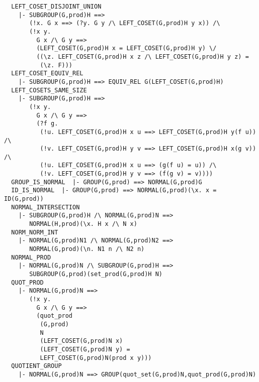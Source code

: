 \newpage
\begin{verbatim}
  LEFT_COSET_DISJOINT_UNION
    |- SUBGROUP(G,prod)H ==>
       (!x. G x ==> (?y. G y /\ LEFT_COSET(G,prod)H y x)) /\
       (!x y.
         G x /\ G y ==>
         (LEFT_COSET(G,prod)H x = LEFT_COSET(G,prod)H y) \/
         ((\z. LEFT_COSET(G,prod)H x z /\ LEFT_COSET(G,prod)H y z) =
          (\z. F)))
  LEFT_COSET_EQUIV_REL
    |- SUBGROUP(G,prod)H ==> EQUIV_REL G(LEFT_COSET(G,prod)H)
  LEFT_COSETS_SAME_SIZE
    |- SUBGROUP(G,prod)H ==>
       (!x y.
         G x /\ G y ==>
         (?f g.
          (!u. LEFT_COSET(G,prod)H x u ==> LEFT_COSET(G,prod)H y(f u)) /\
          (!v. LEFT_COSET(G,prod)H y v ==> LEFT_COSET(G,prod)H x(g v)) /\
          (!u. LEFT_COSET(G,prod)H x u ==> (g(f u) = u)) /\
          (!v. LEFT_COSET(G,prod)H y v ==> (f(g v) = v))))
  GROUP_IS_NORMAL  |- GROUP(G,prod) ==> NORMAL(G,prod)G
  ID_IS_NORMAL  |- GROUP(G,prod) ==> NORMAL(G,prod)(\x. x = ID(G,prod))
  NORMAL_INTERSECTION
    |- SUBGROUP(G,prod)H /\ NORMAL(G,prod)N ==>
       NORMAL(H,prod)(\x. H x /\ N x)
  NORM_NORM_INT
    |- NORMAL(G,prod)N1 /\ NORMAL(G,prod)N2 ==>
       NORMAL(G,prod)(\n. N1 n /\ N2 n)
  NORMAL_PROD
    |- NORMAL(G,prod)N /\ SUBGROUP(G,prod)H ==>
       SUBGROUP(G,prod)(set_prod(G,prod)H N)
  QUOT_PROD
    |- NORMAL(G,prod)N ==>
       (!x y.
         G x /\ G y ==>
         (quot_prod
          (G,prod)
          N
          (LEFT_COSET(G,prod)N x)
          (LEFT_COSET(G,prod)N y) =
          LEFT_COSET(G,prod)N(prod x y)))
  QUOTIENT_GROUP
    |- NORMAL(G,prod)N ==> GROUP(quot_set(G,prod)N,quot_prod(G,prod)N)
\end{verbatim}
\newpage
